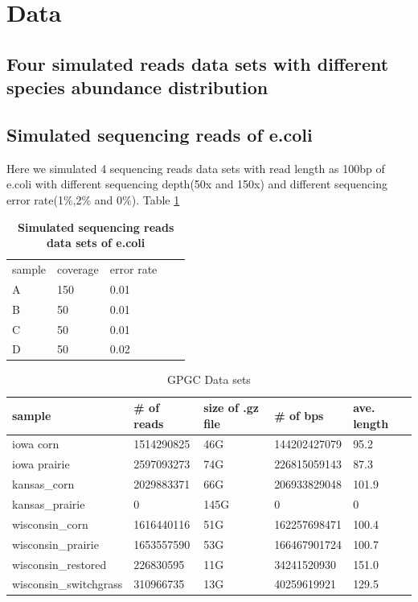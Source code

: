 \documentclass[12pt]{report}
\begin{document}
\section{Data}


\subsection{Four simulated reads data sets with different species abundance distribution}

\subsection{Simulated sequencing reads of e.coli}

Here we simulated 4 sequencing reads data sets with read length as 100bp of e.coli with different sequencing depth(50x and 150x) and different sequencing error rate(1\%,2\% and 0\%). Table \ref{table:ecoli}

\begin{table}[h]
\caption{
\bf{Simulated sequencing reads data sets of e.coli}
}
\begin{tabular}{|l|l|l|ll}
\cline{1-3}
sample & coverage & error rate &  &  \\ \cline{1-3}
A      & 150      & 0.01       &  &  \\ \cline{1-3}
B      & 50       & 0.01       &  &  \\ \cline{1-3}
C      & 50       & 0.01       &  &  \\ \cline{1-3}
D      & 50       & 0.02       &  &  \\ \cline{1-3}
\end{tabular}
\label{table:ecoli}
\end{table}



\begin{table}[h]
\caption{GPGC Data sets}
\label{my-label}
\begin{tabular}{|l|l|l|l|l|}
\hline
sample & \# of reads & size of .gz file & \# of bps & ave. length \\ \hline
iowa corn & 1514290825 & 46G & 144202427079 & 95.2 \\ \hline
iowa prairie & 2597093273 & 74G & 226815059143 & 87.3 \\ \hline
kansas\_corn & 2029883371 & 66G & 206933829048 & 101.9 \\ \hline
kansas\_prairie & 0 & 145G & 0 & 0 \\ \hline
wisconsin\_corn & 1616440116 & 51G & 162257698471 & 100.4 \\ \hline
wisconsin\_prairie & 1653557590 & 53G & 166467901724 & 100.7 \\ \hline
wisconsin\_restored & 226830595 & 11G & 34241520930 & 151.0 \\ \hline
wisconsin\_switchgrass & 310966735 & 13G & 40259619921 & 129.5 \\ \hline
\end{tabular}
\label{table:gpgc}
\end{table}
\end{document}
